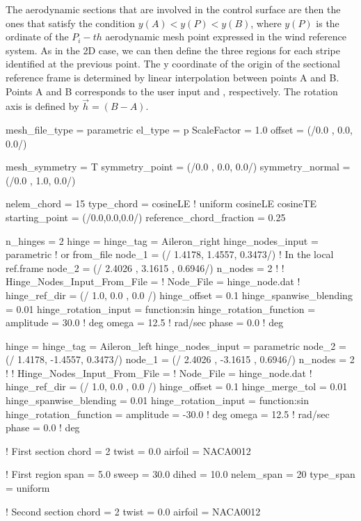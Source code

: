 The aerodynamic sections that are involved in the control surface are then the ones that satisfy the condition $y(A) < y(P) < y(B)$, where $y(P)$ is the ordinate of the $P_i-th$ aerodynamic mesh point expressed in the wind reference system. 
As in the 2D case, we can then define the three regions for each stripe identified at the previous point. The y coordinate of the origin of the sectional reference frame is determined by linear interpolation between points A and B. 
Points A and B corresponds to the user input  and , respectively. The rotation axis is defined by $\Vec{h} = (B - A)$.

\begin{inputfile}[frame=single, caption={Parametric geometry for flapped wing}, label={file:parametric_example_flapped_wing.in}]
mesh_file_type = parametric
el_type = p
ScaleFactor = 1.0
offset = (/0.0 , 0.0,  0.0/)

mesh_symmetry = T
symmetry_point   = (/0.0 , 0.0,  0.0/)
symmetry_normal = (/0.0 , 1.0,  0.0/)

nelem_chord = 15
type_chord = cosineLE   ! uniform  cosineLE  cosineTE
starting_point = (/0.0,0.0,0.0/)
reference_chord_fraction = 0.25

n_hinges = 2
hinge = {
  hinge_tag = Aileron_right
  hinge_nodes_input = parametric      ! or from_file
  node_1 = (/ 1.4178, 1.4557, 0.3473/)  ! In the local ref.frame
  node_2 = (/ 2.4026  , 3.1615  , 0.6946/)
  n_nodes = 2
  ! }
  ! Hinge_Nodes_Input_From_File = {
  !   Node_File = hinge_node.dat
  ! }
  hinge_ref_dir = (/ 1.0, 0.0 , 0.0 /)
  hinge_offset  = 0.1
  hinge_spanwise_blending = 0.01
  hinge_rotation_input = function:sin
  hinge_rotation_function = {
    amplitude = 30.0    ! deg
    omega     =  12.5   ! rad/sec
    phase     =  0.0    ! deg
  }

hinge = {
  hinge_tag = Aileron_left
  hinge_nodes_input = parametric      
  node_2 = (/ 1.4178, -1.4557, 0.3473/)  
  node_1 = (/ 2.4026  , -3.1615  , 0.6946/)
  n_nodes = 2
  ! }
  ! Hinge_Nodes_Input_From_File = {
  !   Node_File = hinge_node.dat
  ! }
  hinge_ref_dir = (/ 1.0, 0.0 , 0.0 /)
  hinge_offset  = 0.1
  hinge_merge_tol = 0.01
  hinge_spanwise_blending = 0.01
  hinge_rotation_input = function:sin
  hinge_rotation_function = {
    amplitude = -30.0    ! deg
    omega     =  12.5    ! rad/sec
    phase     =  0.0     ! deg
  }


! First section
chord = 2
twist = 0.0
airfoil = NACA0012

! First region
span = 5.0
sweep = 30.0
dihed = 10.0
nelem_span = 20
type_span = uniform

! Second section
chord = 2
twist = 0.0
airfoil = NACA0012
\end{inputfile}

